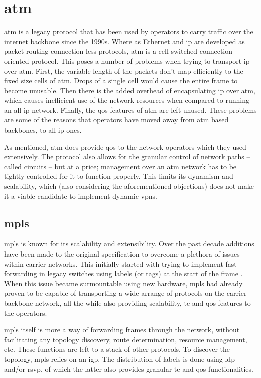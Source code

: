 \section{\acs{atm}} %
\label{sec:atm}
\ac{atm} is a legacy protocol that has been used by operators to carry traffic over the internet backbone since the 1990s. Where as Ethernet and \ac{ip} are developed as packet-routing connection-less protocols, \ac{atm} is a cell-switched connection-oriented protocol. This poses a number of problems when trying to transport \ac{ip} over \ac{atm}. First, the variable length of the packets don't map efficiently to the fixed size cells of \ac{atm}. Drops of a single cell would cause the entire frame to become unusable. Then there is the added overhead of encapsulating \ac{ip} over \ac{atm}, which causes inefficient use of the network resources when compared to running an all \ac{ip} network. Finally, the \ac{qos} features of \ac{atm} are left unused. These problems are some of the reasons that operators have moved away from \ac{atm} based backbones, to all \ac{ip} ones. 

As mentioned, \ac{atm} does provide \ac{qos} to the network operators which they used extensively. The protocol also allows for the granular control of network paths -- called circuits -- but at a price; management over an \ac{atm} network has to be tightly controlled for it to function properly. This limits its dynamism and scalability, which (also considering the aforementioned objections) does not make it a viable candidate to implement dynamic \acp{vpn}.


\subsection{\acs{mpls}} %
\label{sub:mpls}
\ac{mpls} is known for its scalability and extensibility. Over the past decade additions have been made to the original specification to overcome a plethora of issues within carrier networks. This initially started with trying to implement fast forwarding in legacy switches using labels (or tags) at the start of the frame \cite{tag-switching}. When this issue became surmountable using new hardware, \ac{mpls} had already proven to be capable of transporting a wide arrange of protocols on the carrier backbone network, all the while also providing scalability, \ac{te} and \ac{qos} features to the operators.

\ac{mpls} itself is more a way of forwarding frames through the network, without facilitating any topology discovery, route determination, resource management, etc. These functions are left to a stack of other protocols. To discover the topology, \ac{mpls} relies on an \ac{igp}. The distribution of labels is done using \ac{ldp} and/or \ac{rsvp}, of which the latter also provides granular \ac{te} and \ac{qos} functionalities.

